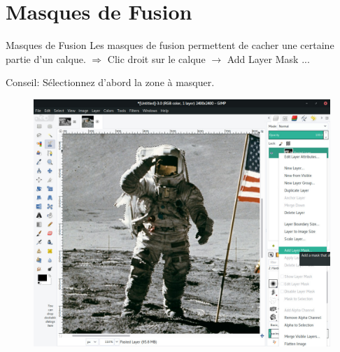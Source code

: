 \documentclass[10pt,svgnames,usenames,table]{beamer}
\begin{document}
\section{Masques de Fusion}
	\begin{frame}{Masques de Fusion}
		Les masques de fusion permettent de cacher une certaine partie d'un calque.
		$\Rightarrow$ Clic droit sur le calque $\rightarrow$ Add Layer Mask ...
		
		Conseil: Sélectionnez d'abord la zone à masquer.
		\begin{center}
			\begin{figure}		
				\includegraphics[scale=.15]{Images/mask/mask1} 				
			\end{figure}	
		\end{center}
	\end{frame}
\end{document}
